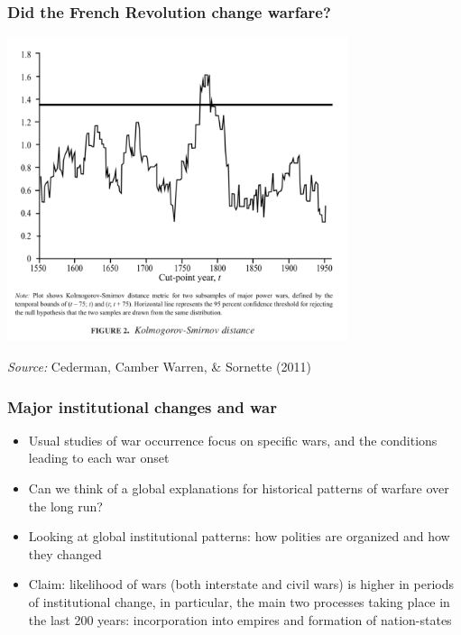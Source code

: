 \documentclass[utf8, xcolor=dvipsnames]{beamer}
\begin{document}
\begin{frame}
\frametitle{Did the French Revolution change warfare?}
\centering

\includegraphics[width = 0.75\textwidth]{img/cederman_et_al_fig2}

{\scriptsize \textit{Source:} Cederman, Camber Warren, \& Sornette (2011)}

\end{frame}

\begin{frame}
\frametitle{Major institutional changes and war}
\centering

\begin{itemize}[<+->]
  \item Usual studies of war occurrence focus on specific wars, and the conditions leading to each war onset
  \item Can we think of a global explanations for historical patterns of warfare over the long run?
  \item Looking at global institutional patterns: how polities are organized and how they changed
  \item Claim: likelihood of wars (both interstate and civil wars) is higher in periods of institutional change, in particular, the main two processes taking place in the last 200 years: incorporation into empires and formation of nation-states
\end{itemize}

\end{frame}
\end{document}
